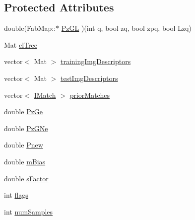 \subsection*{Protected Attributes}
\begin{DoxyCompactItemize}
\item 
double(Fab\-Map\-::$\ast$ \hyperlink{classcv_1_1of2_1_1FabMap_ad0c2ef3b7d4194d6a0eeeac8aca8857f}{Pz\-G\-L} )(int q, bool zq, bool zpq, bool Lzq)
\item 
Mat \hyperlink{classcv_1_1of2_1_1FabMap_a54e4331990e8069be69fec53b545c2bd}{cl\-Tree}
\item 
vector$<$ Mat $>$ \hyperlink{classcv_1_1of2_1_1FabMap_ac5c54c9cca20b7ffb83ac10a591e60fe}{training\-Img\-Descriptors}
\item 
vector$<$ Mat $>$ \hyperlink{classcv_1_1of2_1_1FabMap_a46f350e86965ec1e00ae4bd629dd4c8d}{test\-Img\-Descriptors}
\item 
vector$<$ \hyperlink{structcv_1_1of2_1_1IMatch}{I\-Match} $>$ \hyperlink{classcv_1_1of2_1_1FabMap_a0a4a45f92a3ea9fd74ac0b0933eef184}{prior\-Matches}
\item 
double \hyperlink{classcv_1_1of2_1_1FabMap_a0c79d4180f0ffe49bfbfe541b9981e7b}{Pz\-Ge}
\item 
double \hyperlink{classcv_1_1of2_1_1FabMap_a0bf851f305f6a00d5a837a7c70e40f3d}{Pz\-G\-Ne}
\item 
double \hyperlink{classcv_1_1of2_1_1FabMap_a953065fb908d0ac9b72bac04d6779415}{Pnew}
\item 
double \hyperlink{classcv_1_1of2_1_1FabMap_a7c6d2872e9274aa8db564b0a37722865}{m\-Bias}
\item 
double \hyperlink{classcv_1_1of2_1_1FabMap_a2283bacbeb4cae2c01ba1e0fbc9c4974}{s\-Factor}
\item 
int \hyperlink{classcv_1_1of2_1_1FabMap_a336756c9be2fff682ab3c559c26765eb}{flags}
\item 
int \hyperlink{classcv_1_1of2_1_1FabMap_a023e2c53333bb5505baceb182011980f}{num\-Samples}
\end{DoxyCompactItemize}


